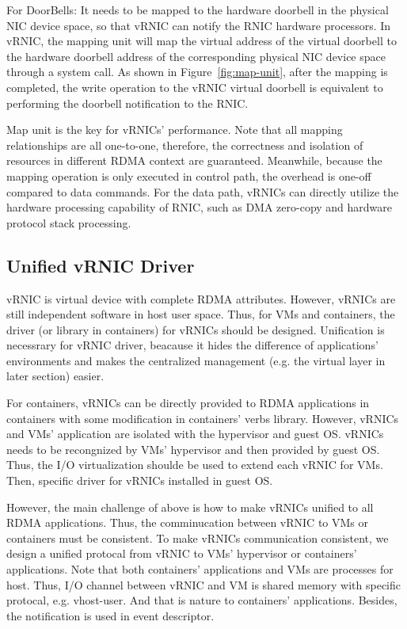 For DoorBells: It needs to be mapped to the hardware doorbell in the physical NIC device space, so that vRNIC can notify the RNIC hardware processors. In vRNIC, the mapping unit will map the virtual address of the virtual doorbell to the hardware doorbell address of the corresponding physical NIC device space through a system call. As shown in Figure~\ref{fig:map-unit}, after the mapping is completed, the write operation to the vRNIC virtual doorbell is equivalent to performing the doorbell notification to the RNIC.

Map unit is the key for vRNICs' performance. Note that all mapping relationships are all one-to-one, therefore, the correctness and isolation of resources in different RDMA context are guaranteed. Meanwhile, because the mapping operation is only executed in control path, the overhead is one-off compared to data commands. For the data path, vRNICs can directly utilize the hardware processing capability of RNIC, such as DMA zero-copy and hardware protocol stack processing.

\subsection{Unified vRNIC Driver}
vRNIC is virtual device with complete RDMA attributes. However, vRNICs are still independent software in host user space. Thus, for VMs and containers, the driver (or library in containers) for vRNICs should be designed. Unification is necessrary for vRNIC driver, beacause it hides the difference of applications' environments and makes the centralized management (e.g. the virtual layer in later section) easier.

For containers, vRNICs can be directly provided to RDMA applications in containers with some modification in containers' verbs library. However, vRNICs  and VMs' application are isolated with the hypervisor and guest OS. vRNICs needs to be recongnized by VMs' hypervisor and then provided by guest OS. Thus, the I/O virtualization shoulde be used to extend each vRNIC for VMs. Then, specific driver for vRNICs installed in guest OS. 

However, the main challenge of above is how to make vRNICs unified to all RDMA applications. Thus, the comminucation between vRNIC to VMs or containers must be consistent. To make vRNICs communication consistent, we design a unified protocal from vRNIC to VMs' hypervisor or containers' applications. Note that both containers' applications and VMs are processes for host. Thus, I/O channel between vRNIC and VM is shared memory with specific protocal, e.g. vhost-user. And that is nature to containers' applications. Besides, the notification is used in event descriptor.

